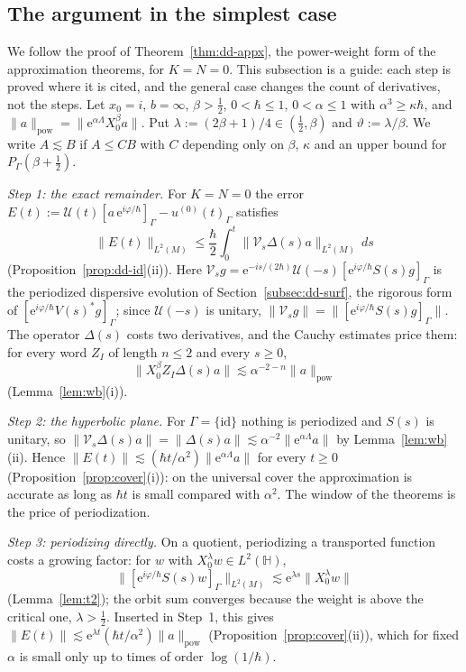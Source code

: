 \documentclass[twoside,10pt]{article}
\numberwithin{equation}{section}
\theoremstyle{slbody}
\theoremstyle{remark}
\newcommand{\Hb}{\mathbb{H}}
\newcommand{\norm}[1]{\lVert #1\rVert}
\newcommand{\ue}{\mathrm{e}}
\newcommand{\cU}{\mathcal{U}}
\newcommand{\pwNorm}[1]{\norm{#1}_{\mathrm{pow}}}
\begin{document}
\subsection{The argument in the simplest case}\label{subsec:simplest}
We follow the proof of Theorem~\ref{thm:dd-appx}, the power-weight form of the approximation theorems, for $K=N=0$. This
subsection is a guide: each step is proved where it is cited, and the general case changes the count of derivatives, not the
steps. Let $x_0=i$, $b=\infty$, $\beta>\tfrac12$, $0<\hbar\le1$, $0<\alpha\le1$ with $\alpha^3\ge\kappa\hbar$, and
$\pwNorm a=\norm{\ue^{\alpha\Lambda}X_0^\beta a}$. Put $\lambda:=(2\beta+1)/4\in(\tfrac12,\beta)$ and $\vartheta:=\lambda/\beta$. We write
$A\lesssim B$ if $A\le CB$ with $C$ depending only on $\beta$, $\kappa$ and an upper bound for $P_\Gamma(\beta+\tfrac12)$.

\emph{Step 1: the exact remainder.} For $K=N=0$ the error $E(t):=\cU(t)[a\,\ue^{i\varphi/\hbar}]_\Gamma-u^{(0)}(t)_\Gamma$ satisfies
\[
  \norm{E(t)}_{L^2(M)}\le\frac\hbar2\int_0^t\norm{\mathcal V_s\Delta(s)a}_{L^2(M)}\,ds
\]
(Proposition~\ref{prop:dd-id}(ii)). Here $\mathcal V_sg=\ue^{-is/(2\hbar)}\cU(-s)[\ue^{i\varphi/\hbar}S(s)g]_\Gamma$ is the periodized
dispersive evolution of Section~\ref{subsec:dd-surf}, the rigorous form of $[\ue^{i\varphi/\hbar}V(s)^*g]_\Gamma$; since $\cU(-s)$ is unitary,
$\norm{\mathcal V_sg}=\norm{[\ue^{i\varphi/\hbar}S(s)g]_\Gamma}$. The operator $\Delta(s)$ costs two derivatives, and the Cauchy estimates
price them: for every word $Z_I$ of length $n\le2$ and every $s\ge0$,
\[
  \norm{X_0^\beta Z_I\Delta(s)a}\lesssim\alpha^{-2-n}\pwNorm a
\]
(Lemma~\ref{lem:wb}(i)).

\emph{Step 2: the hyperbolic plane.} For $\Gamma=\{\mathrm{id}\}$ nothing is periodized and $S(s)$ is unitary, so
$\norm{\mathcal V_s\Delta(s)a}=\norm{\Delta(s)a}\lesssim\alpha^{-2}\norm{\ue^{\alpha\Lambda}a}$ by Lemma~\ref{lem:wb}(ii). Hence
$\norm{E(t)}\lesssim(\hbar t/\alpha^2)\norm{\ue^{\alpha\Lambda}a}$ for every $t\ge0$ (Proposition~\ref{prop:cover}(i)): on the universal cover
the approximation is accurate as long as $\hbar t$ is small compared with $\alpha^2$. The window of the theorems is the price of
periodization.

\emph{Step 3: periodizing directly.} On a quotient, periodizing a transported function costs a growing factor: for $w$ with
$X_0^\lambda w\in L^2(\Hb)$,
\[
  \norm{[\ue^{i\varphi/\hbar}S(s)w]_\Gamma}_{L^2(M)}\lesssim\ue^{\lambda s}\norm{X_0^\lambda w}
\]
(Lemma~\ref{lem:t2}); the orbit sum converges because the weight is above the critical one, $\lambda>\tfrac12$. Inserted in Step~1,
this gives $\norm{E(t)}\lesssim\ue^{\lambda t}(\hbar t/\alpha^2)\pwNorm a$ (Proposition~\ref{prop:cover}(ii)), which for fixed $\alpha$ is
small only up to times of order $\log(1/\hbar)$.
\end{document}
